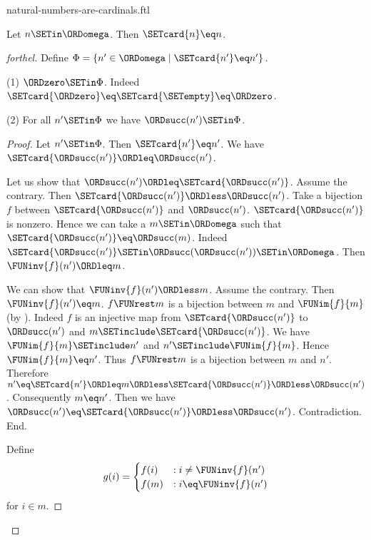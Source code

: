 \documentclass{naproche-library}
\begin{document}
\begin{smodule}[title=Natural Numbers are Cardinal Numbers]{natural-numbers-are-cardinals.ftl}

\begin{theorem}[forthel,id=SET_THEORY_07_2948332552978432]
  Let $n \SETin \ORDomega$.
  Then $\SETcard{n} \eq n$.
\end{theorem}
\begin{proof}[forthel]
  Define $\Phi = \{ n' \in \ORDomega \mid \SETcard{n'} \eq n' \}$.

  (1) $\ORDzero \SETin \Phi$.
  Indeed $\SETcard{\ORDzero} \eq \SETcard{\SETempty} \eq \ORDzero$.

  (2) For all $n' \SETin \Phi$ we have $\ORDsucc(n') \SETin \Phi$.
  \begin{proof}
    Let $n' \SETin \Phi$.
    Then $\SETcard{n'} \eq n'$.
    We have $\SETcard{\ORDsucc(n')} \ORDleq \ORDsucc(n')$.

    Let us show that $\ORDsucc(n') \ORDleq \SETcard{\ORDsucc(n')}$.
      Assume the contrary.
      Then $\SETcard{\ORDsucc(n')} \ORDless \ORDsucc(n')$.
      Take a bijection $f$ between $\SETcard{\ORDsucc(n')}$ and $\ORDsucc(n')$.
      $\SETcard{\ORDsucc(n')}$ is nonzero.
      Hence we can take a $m \SETin \ORDomega$ such that $\SETcard{\ORDsucc(n')} \eq \ORDsucc(m)$.
      Indeed $\SETcard{\ORDsucc(n')} \SETin \ORDsucc(\ORDsucc(n')) \SETin \ORDomega$.
      Then $\FUNinv{f}(n') \ORDleq m$.

      We can show that $\FUNinv{f}(n') \ORDless m$.
        Assume the contrary.
        Then $\FUNinv{f}(n') \eq m$.
        $f \FUNrest m$ is a bijection between $m$ and $\FUNim{f}{m}$ (by ).
        Indeed $f$ is an injective map from $\SETcard{\ORDsucc(n')}$ to $\ORDsucc(n')$ and
        $m \SETinclude \SETcard{\ORDsucc(n')}$.
        We have $\FUNim{f}{m} \SETinclude n'$ and $n' \SETinclude \FUNim{f}{m}$.
        Hence $\FUNim{f}{m} \eq n'$.
        Thus $f \FUNrest m$ is a bijection between $m$ and $n'$.
        Therefore $n'
          \eq \SETcard{n'}
          \ORDleq m
          \ORDless \SETcard{\ORDsucc(n')}
          \ORDless \ORDsucc(n')$.
        Consequently $m \eq n'$.
        Then we have $\ORDsucc(n') \eq \SETcard{\ORDsucc(n')} \ORDless \ORDsucc(n')$.
        Contradiction.
      End.

      Define \[ g(i) =
        \begin{cases}
          f(i)  & : i \neq \FUNinv{f}(n')
          \\
          f(m)  & : i \eq \FUNinv{f}(n')
        \end{cases} \]
      for $i \in m$.


\end{proof}
\end{proof}
\end{smodule}
\end{document}
